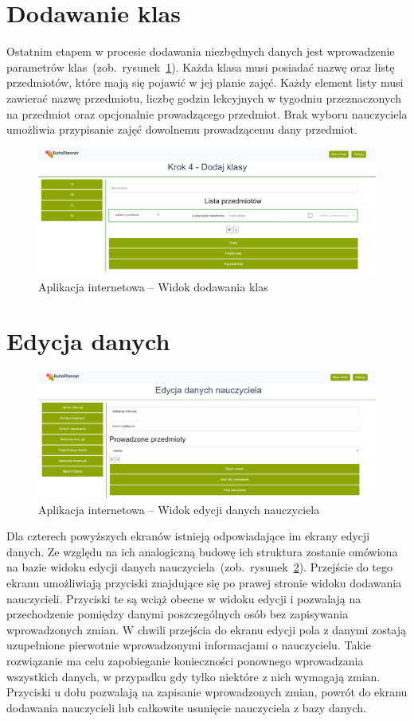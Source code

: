 \section{Dodawanie klas}
Ostatnim etapem w procesie dodawania niezbędnych danych jest wprowadzenie parametrów klas~(zob.~rysunek~\ref{rys:class}). Każda klasa musi posiadać nazwę oraz listę przedmiotów, które mają się pojawić w jej planie zajęć. Każdy element listy musi zawierać nazwę przedmiotu, liczbę godzin lekcyjnych w tygodniu przeznaczonych na przedmiot oraz opcjonalnie prowadzącego przedmiot. Brak wyboru nauczyciela umożliwia przypisanie zajęć dowolnemu prowadzącemu dany przedmiot.
\begin{figure}[!ht]
\centering\includegraphics[width=\textwidth]{figures/class}
\caption{Aplikacja internetowa -- Widok dodawania klas}\label{rys:class}
\end{figure}
\section{Edycja danych}
\begin{figure}[!ht]
\centering\includegraphics[width=\textwidth]{figures/edit}
\caption{Aplikacja internetowa -- Widok edycji danych nauczyciela}\label{rys:edit}
\end{figure}
Dla czterech powyższych ekranów istnieją odpowiadające im ekrany edycji danych. Ze względu na ich analogiczną budowę ich struktura zostanie omówiona na bazie widoku edycji danych nauczyciela~(zob.~rysunek~\ref{rys:edit}). Przejście do tego ekranu umożliwiają przyciski znajdujące się po prawej stronie widoku dodawania nauczycieli. Przyciski te są wciąż obecne w widoku edycji i pozwalają na przechodzenie pomiędzy danymi poszczególnych osób bez zapisywania wprowadzonych zmian. W chwili przejścia do ekranu edycji pola z danymi zostają uzupełnione pierwotnie wprowadzonymi informacjami o nauczycielu. Takie rozwiązanie ma celu zapobieganie konieczności ponownego wprowadzania wszystkich danych, w przypadku gdy tylko niektóre z nich wymagają zmian. Przyciski u dołu pozwalają na zapisanie wprowadzonych zmian, powrót do ekranu dodawania nauczycieli lub całkowite usunięcie nauczyciela z bazy danych.
